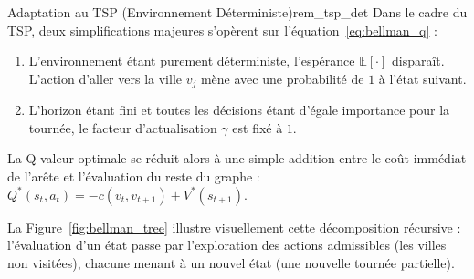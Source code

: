 \documentclass[12pt, a4paper, twoside, openright]{book}
\newcommand{\E}{\mathbb{E}}
\begin{document}
	\begin{remark}{Adaptation au TSP (Environnement Déterministe)}{rem_tsp_det}
		Dans le cadre du TSP, deux simplifications majeures s'opèrent sur l'équation~\eqref{eq:bellman_q} :
		\begin{enumerate}
			\item L'environnement étant purement déterministe, l'espérance $\E[\cdot]$ disparaît. L'action d'aller vers la ville $v_j$ mène avec une probabilité de $1$ à l'état suivant.
			\item L'horizon étant fini et toutes les décisions étant d'égale importance pour la tournée, le facteur d'actualisation $\gamma$ est fixé à $1$.
		\end{enumerate}
		La Q-valeur optimale se réduit alors à une simple addition entre le coût immédiat de l'arête et l'évaluation du reste du graphe : $Q^*(s_t, a_t) = -c(v_t, v_{t+1}) + V^*(s_{t+1})$.
	\end{remark}
	
	La Figure~\ref{fig:bellman_tree} illustre visuellement cette décomposition récursive : l'évaluation d'un état passe par l'exploration des actions admissibles (les villes non visitées), chacune menant à un nouvel état (une nouvelle tournée partielle).
	
\end{document}
